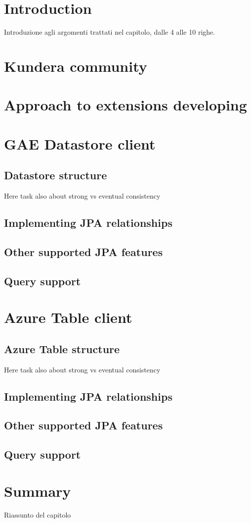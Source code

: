 \section{Introduction}
Introduzione agli argomenti trattati nel capitolo, dalle 4 alle 10 righe.

\section{Kundera community}

\section{Approach to extensions developing}

\section{GAE Datastore client}

\subsection{Datastore structure}
Here task also about strong vs eventual consistency

\subsection{Implementing JPA relationships}

\subsection{Other supported JPA features}

\subsection{Query support}

\section{Azure Table client}

\subsection{Azure Table structure}
Here task also about strong vs eventual consistency

\subsection{Implementing JPA relationships}

\subsection{Other supported JPA features}

\subsection{Query support}

\section{Summary}
Riassunto del capitolo
